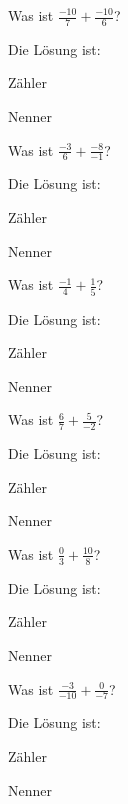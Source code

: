 \documentclass{ximera}
\begin{document}
\begin{shuffle}
\begin{question}
Was ist $\frac{-10}{7} + \frac{-10}{6}$?
\begin{solution}
Die Lösung ist:

Zähler 

Nenner 
\end{solution}
\end{question}


\begin{question}
Was ist $\frac{-3}{6} + \frac{-8}{-1}$?
\begin{solution}
Die Lösung ist:

Zähler 

Nenner 
\end{solution}
\end{question}


\begin{question}
Was ist $\frac{-1}{4} + \frac{1}{5}$?
\begin{solution}
Die Lösung ist:

Zähler 

Nenner 
\end{solution}
\end{question}


\begin{question}
Was ist $\frac{6}{7} + \frac{5}{-2}$?
\begin{solution}
Die Lösung ist:

Zähler 

Nenner 
\end{solution}
\end{question}


\begin{question}
Was ist $\frac{0}{3} + \frac{10}{8}$?
\begin{solution}
Die Lösung ist:

Zähler 

Nenner 
\end{solution}
\end{question}


\begin{question}
Was ist $\frac{-3}{-10} + \frac{0}{-7}$?
\begin{solution}
Die Lösung ist:

Zähler 

Nenner 
\end{solution}
\end{question}



\end{shuffle}
\end{document}
